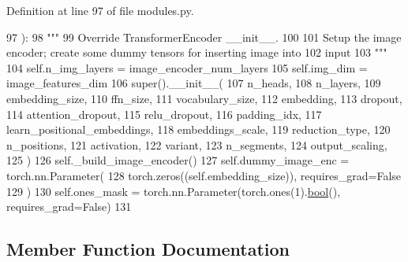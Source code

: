 Definition at line 97 of file modules.\+py.


\begin{DoxyCode}
97     ):
98         \textcolor{stringliteral}{"""}
99 \textcolor{stringliteral}{        Override TransformerEncoder \_\_init\_\_.}
100 \textcolor{stringliteral}{}
101 \textcolor{stringliteral}{        Setup the image encoder; create some dummy tensors for inserting image into}
102 \textcolor{stringliteral}{        input}
103 \textcolor{stringliteral}{        """}
104         self.n\_img\_layers = image\_encoder\_num\_layers
105         self.img\_dim = image\_features\_dim
106         super().\_\_init\_\_(
107             n\_heads,
108             n\_layers,
109             embedding\_size,
110             ffn\_size,
111             vocabulary\_size,
112             embedding,
113             dropout,
114             attention\_dropout,
115             relu\_dropout,
116             padding\_idx,
117             learn\_positional\_embeddings,
118             embeddings\_scale,
119             reduction\_type,
120             n\_positions,
121             activation,
122             variant,
123             n\_segments,
124             output\_scaling,
125         )
126         self.\_build\_image\_encoder()
127         self.dummy\_image\_enc = torch.nn.Parameter(
128             torch.zeros((self.embedding\_size)), requires\_grad=\textcolor{keyword}{False}
129         )
130         self.ones\_mask = torch.nn.Parameter(torch.ones(1).\hyperlink{namespaceprojects_1_1mastering__the__dungeon_1_1mturk_1_1tasks_1_1MTD_1_1run_a6fc0c9b519a36f82b65bcd398f1fbb9d}{bool}(), requires\_grad=\textcolor{keyword}{False})
131 
\end{DoxyCode}


\subsection{Member Function Documentation}
\mbox{\label{classparlai_1_1agents_1_1image__seq2seq_1_1modules_1_1ContextWithImageEncoder_a03fc792c375aeca9a956a5f9835c5660}} 
